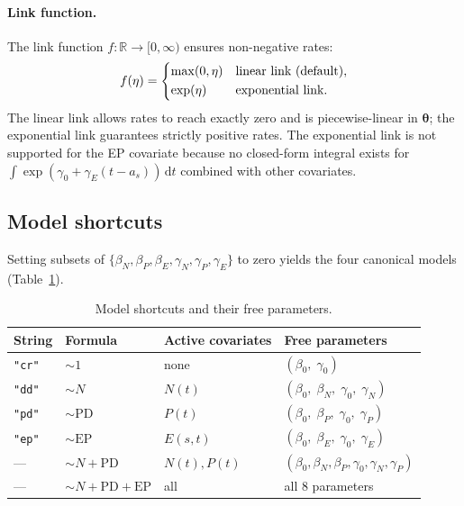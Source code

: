 \documentclass[12pt,a4paper]{article}
\newcommand{\pars}{\bm{\theta}}
\newcommand{\R}{\mathbb{R}}
\newcommand{\dd}{\,\mathrm{d}}
\begin{document}
\paragraph{Link function.}
The link function $f:\R\to[0,\infty)$ ensures non-negative rates:
\begin{equation}\label{eq:link}
  f(\eta) =
  \begin{dcases}
    \max(0, \eta) & \text{linear link (default)}, \\
    \exp(\eta)    & \text{exponential link}.
  \end{dcases}
\end{equation}
The linear link allows rates to reach exactly zero and is piecewise-linear
in $\pars$; the exponential link guarantees strictly positive rates. The
exponential link is not supported for the EP covariate because no closed-form
integral exists for $\int \exp(\gamma_0 + \gamma_E(t-a_s))\dd t$ combined
with other covariates.

\subsection{Model shortcuts}\label{sec:models}

Setting subsets of $\{\beta_N, \beta_P, \beta_E, \gamma_N, \gamma_P,
\gamma_E\}$ to zero yields the four canonical models (Table~\ref{tab:models}).

\begin{table}[ht]
\centering
\caption{Model shortcuts and their free parameters.}\label{tab:models}
\renewcommand{\arraystretch}{1.2}
\begin{tabular}{lllp{7cm}}
\toprule
String & Formula & Active covariates & Free parameters \\
\midrule
\texttt{"cr"} & $\sim 1$ & none
  & $(\beta_0,\; \gamma_0)$ \\
\texttt{"dd"} & $\sim N$ & $N(t)$
  & $(\beta_0,\; \beta_N,\; \gamma_0,\; \gamma_N)$ \\
\texttt{"pd"} & $\sim \mathrm{PD}$ & $P(t)$
  & $(\beta_0,\; \beta_P,\; \gamma_0,\; \gamma_P)$ \\
\texttt{"ep"} & $\sim \mathrm{EP}$ & $E(s,t)$
  & $(\beta_0,\; \beta_E,\; \gamma_0,\; \gamma_E)$ \\
--- & $\sim N + \mathrm{PD}$ & $N(t),P(t)$
  & $(\beta_0,\beta_N,\beta_P,\gamma_0,\gamma_N,\gamma_P)$ \\
--- & $\sim N + \mathrm{PD} + \mathrm{EP}$ & all
  & all 8 parameters \\
\bottomrule
\end{tabular}
\end{table}
\end{document}
